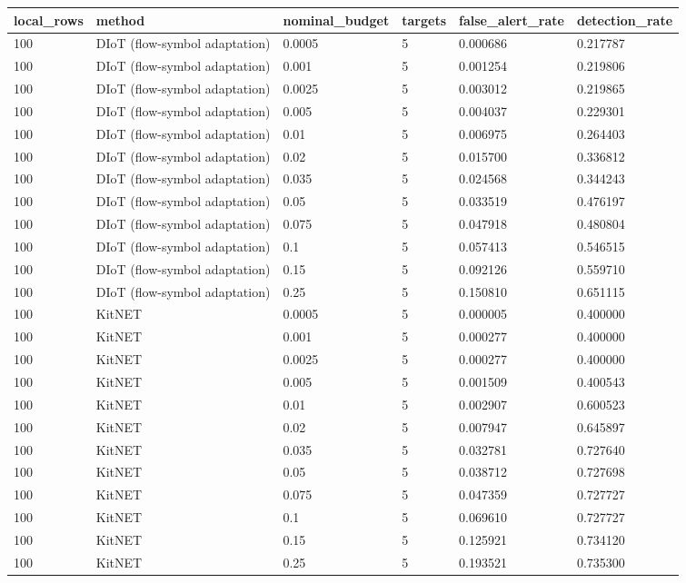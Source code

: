 \begin{tabular}{llllll}
\toprule
local\_rows & method & nominal\_budget & targets & false\_alert\_rate & detection\_rate \\
\midrule
100 & DIoT (flow-symbol adaptation) & 0.0005 & 5 & 0.000686 & 0.217787 \\
100 & DIoT (flow-symbol adaptation) & 0.001 & 5 & 0.001254 & 0.219806 \\
100 & DIoT (flow-symbol adaptation) & 0.0025 & 5 & 0.003012 & 0.219865 \\
100 & DIoT (flow-symbol adaptation) & 0.005 & 5 & 0.004037 & 0.229301 \\
100 & DIoT (flow-symbol adaptation) & 0.01 & 5 & 0.006975 & 0.264403 \\
100 & DIoT (flow-symbol adaptation) & 0.02 & 5 & 0.015700 & 0.336812 \\
100 & DIoT (flow-symbol adaptation) & 0.035 & 5 & 0.024568 & 0.344243 \\
100 & DIoT (flow-symbol adaptation) & 0.05 & 5 & 0.033519 & 0.476197 \\
100 & DIoT (flow-symbol adaptation) & 0.075 & 5 & 0.047918 & 0.480804 \\
100 & DIoT (flow-symbol adaptation) & 0.1 & 5 & 0.057413 & 0.546515 \\
100 & DIoT (flow-symbol adaptation) & 0.15 & 5 & 0.092126 & 0.559710 \\
100 & DIoT (flow-symbol adaptation) & 0.25 & 5 & 0.150810 & 0.651115 \\
100 & KitNET & 0.0005 & 5 & 0.000005 & 0.400000 \\
100 & KitNET & 0.001 & 5 & 0.000277 & 0.400000 \\
100 & KitNET & 0.0025 & 5 & 0.000277 & 0.400000 \\
100 & KitNET & 0.005 & 5 & 0.001509 & 0.400543 \\
100 & KitNET & 0.01 & 5 & 0.002907 & 0.600523 \\
100 & KitNET & 0.02 & 5 & 0.007947 & 0.645897 \\
100 & KitNET & 0.035 & 5 & 0.032781 & 0.727640 \\
100 & KitNET & 0.05 & 5 & 0.038712 & 0.727698 \\
100 & KitNET & 0.075 & 5 & 0.047359 & 0.727727 \\
100 & KitNET & 0.1 & 5 & 0.069610 & 0.727727 \\
100 & KitNET & 0.15 & 5 & 0.125921 & 0.734120 \\
100 & KitNET & 0.25 & 5 & 0.193521 & 0.735300 \\

\end{tabular}
